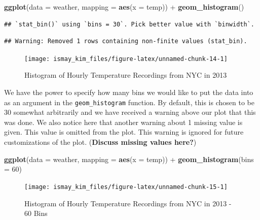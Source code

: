 \documentclass[]{tufte-book}
\newenvironment{Shaded}{\begin{snugshade}}{\end{snugshade}}
\newcommand{\KeywordTok}[1]{\textcolor[rgb]{0.13,0.29,0.53}{\textbf{{#1}}}}
\newcommand{\DataTypeTok}[1]{\textcolor[rgb]{0.13,0.29,0.53}{{#1}}}
\newcommand{\DecValTok}[1]{\textcolor[rgb]{0.00,0.00,0.81}{{#1}}}
\newcommand{\StringTok}[1]{\textcolor[rgb]{0.31,0.60,0.02}{{#1}}}
\newcommand{\NormalTok}[1]{{#1}}
\begin{document}
\begin{Shaded}
\begin{Highlighting}[]
\KeywordTok{ggplot}\NormalTok{(}\DataTypeTok{data =} \NormalTok{weather, }\DataTypeTok{mapping =} \KeywordTok{aes}\NormalTok{(}\DataTypeTok{x =} \NormalTok{temp)) +}
\StringTok{  }\KeywordTok{geom_histogram}\NormalTok{()}
\end{Highlighting}
\end{Shaded}

\begin{verbatim}
## `stat_bin()` using `bins = 30`. Pick better value with `binwidth`.
\end{verbatim}

\begin{verbatim}
## Warning: Removed 1 rows containing non-finite values (stat_bin).
\end{verbatim}

\begin{figure}
\texttt{[image: ismay\_kim\_files/figure-latex/unnamed-chunk-14-1]} \caption[Histogram of Hourly Temperature Recordings from NYC in 2013]{Histogram of Hourly Temperature Recordings from NYC in 2013}\label{fig:unnamed-chunk-14}
\end{figure}

We have the power to specify how many bins we would like to put the data
into as an argument in the \texttt{geom\_histogram} function. By
default, this is chosen to be 30 somewhat arbitrarily and we have
received a warning above our plot that this was done. We also notice
here that another warning about 1 missing value is given. This value is
omitted from the plot. This warning is ignored for future customizations
of the plot. (\textbf{Discuss missing values here?})

\begin{Shaded}
\begin{Highlighting}[]
\KeywordTok{ggplot}\NormalTok{(}\DataTypeTok{data =} \NormalTok{weather, }\DataTypeTok{mapping =} \KeywordTok{aes}\NormalTok{(}\DataTypeTok{x =} \NormalTok{temp)) +}
\StringTok{  }\KeywordTok{geom_histogram}\NormalTok{(}\DataTypeTok{bins =} \DecValTok{60}\NormalTok{)}
\end{Highlighting}
\end{Shaded}

\begin{figure}
\texttt{[image: ismay\_kim\_files/figure-latex/unnamed-chunk-15-1]} \caption[Histogram of Hourly Temperature Recordings from NYC in 2013 - 60 Bins]{Histogram of Hourly Temperature Recordings from NYC in 2013 - 60 Bins}\label{fig:unnamed-chunk-15}
\end{figure}
\end{document}
